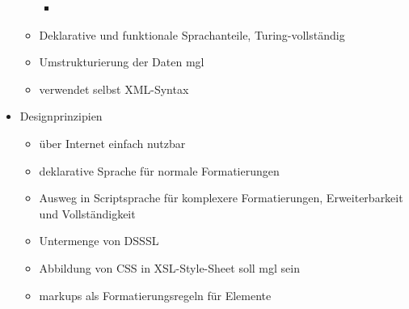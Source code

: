 \begin{itemize}
\begin{itemize}
\begin{itemize}
\begin{figure}[!h]
			\end{figure}
		\end{itemize}
		\begin{itemize}
			\item 
		\end{itemize}
		\item Deklarative und funktionale Sprachanteile, Turing-vollständig
		\item Umstrukturierung der Daten mgl
		\item verwendet selbst XML-Syntax
	\end{itemize}
	\item Designprinzipien
	\begin{itemize}
		\item über Internet einfach nutzbar
		\item deklarative Sprache für normale Formatierungen
		\item Ausweg in Scriptsprache für komplexere Formatierungen, Erweiterbarkeit und Vollständigkeit
		\item Untermenge von DSSSL
		\item Abbildung von CSS in XSL-Style-Sheet soll mgl sein
		\item markups als Formatierungsregeln für Elemente
	\end{itemize}
\end{itemize}

